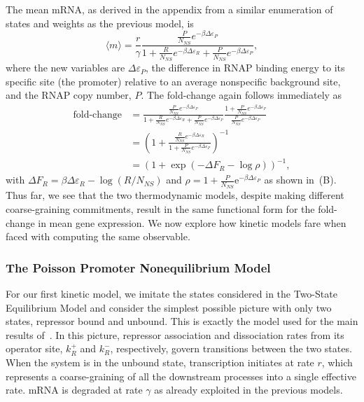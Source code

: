 The mean mRNA, as derived in the appendix from a similar enumeration of states
and weights as the previous model, is
\begin{equation}
\langle m \rangle = \frac{r}{\gamma}
\frac{\frac{P}{N_{NS}} e^{-\beta\Delta\varepsilon_P}}
        {
        1 + \frac{R}{N_{NS}} e^{-\beta\Delta\varepsilon_R}
        + \frac{P}{N_{NS}} e^{-\beta\Delta\varepsilon_P}
        },
\end{equation}
where the new variables are $\Delta\varepsilon_P$, the difference in RNAP
binding energy to its specific site (the promoter) relative to an average
nonspecific background site, and the RNAP copy number, $P$. The fold-change
again follows immediately as
\begin{align}
\text{fold-change}
&= \frac{\frac{P}{N_{NS}} e^{-\beta\Delta\varepsilon_P}}
        {
        1 + \frac{R}{N_{NS}} e^{-\beta\Delta\varepsilon_R}
        + \frac{P}{N_{NS}} e^{-\beta\Delta\varepsilon_P}
        }
\frac{1 + \frac{P}{N_{NS}} e^{-\beta\Delta\varepsilon_P}}
        {\frac{P}{N_{NS}} e^{-\beta\Delta\varepsilon_P}}
\\
&= \left(
1 + \frac{\frac{R}{N_{NS}} e^{-\beta\Delta\varepsilon_R}}
        {1 + \frac{P}{N_{NS}} e^{-\beta\Delta\varepsilon_P}}
\right)^{-1}
\\
&= (1 + \exp(-\Delta F_R - \log\rho))^{-1},
\end{align}
with $\Delta F_R = \beta\Delta\varepsilon_R - \log(R/N_{NS})$ and $\rho = 1 +
\frac{P}{N_{NS}}\mathrm{e}^{-\beta\Delta\varepsilon_P}$ as shown
in~(B). Thus far, we see that the two thermodynamic
models, despite making different coarse-graining commitments, result in the same
functional form for the fold-change in mean gene expression.  We now explore how
kinetic models fare when faced with computing the same observable.

\subsubsection{The Poisson Promoter Nonequilibrium Model}
For our first kinetic model, we  imitate the states considered in the Two-State
Equilibrium Model and consider the simplest possible picture with only two
states, repressor bound and unbound. This is exactly the model used for the main
results of~\cite{Jones2014}. In this picture, repressor association and
dissociation rates from its operator site, $k_R^+$ and $k_R^-$, respectively,
govern transitions between the two states. When the system is in the unbound
state, transcription initiates at rate $r$, which represents a coarse-graining
of all the downstream processes into a single effective rate. mRNA is degraded
at rate $\gamma$ as already exploited in the previous models.

